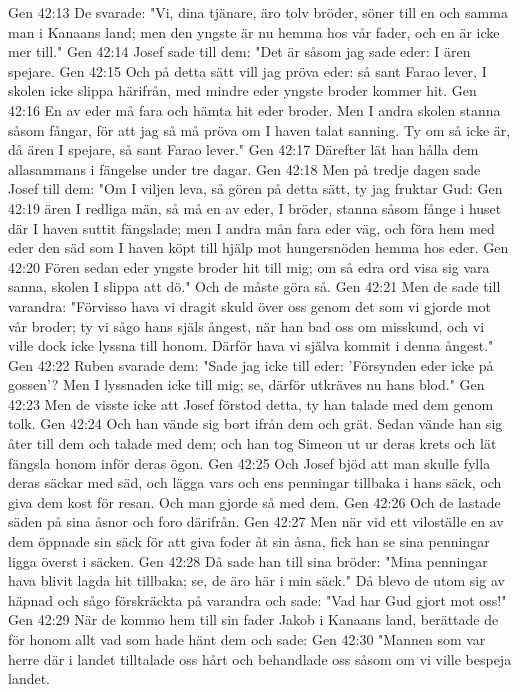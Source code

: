 Gen 42:13  De svarade: "Vi, dina tjänare, äro tolv bröder, söner till en och samma man i Kanaans land; men den yngste är nu hemma hos vår fader, och en är icke mer till."
Gen 42:14  Josef sade till dem: "Det är såsom jag sade eder: I ären spejare.
Gen 42:15  Och på detta sätt vill jag pröva eder: så sant Farao lever, I skolen icke slippa härifrån, med mindre eder yngste broder kommer hit.
Gen 42:16  En av eder må fara och hämta hit eder broder. Men I andra skolen stanna såsom fångar, för att jag så må pröva om I haven talat sanning. Ty om så icke är, då ären I spejare, så sant Farao lever."
Gen 42:17  Därefter lät han hålla dem allasammans i fängelse under tre dagar.
Gen 42:18  Men på tredje dagen sade Josef till dem: "Om I viljen leva, så gören på detta sätt, ty jag fruktar Gud:
Gen 42:19  ären I redliga män, så må en av eder, I bröder, stanna såsom fånge i huset där I haven suttit fängslade; men I andra mån fara eder väg, och föra hem med eder den säd som I haven köpt till hjälp mot hungersnöden hemma hos eder.
Gen 42:20  Fören sedan eder yngste broder hit till mig; om så edra ord visa sig vara sanna, skolen I slippa att dö." Och de måste göra så.
Gen 42:21  Men de sade till varandra: "Förvisso hava vi dragit skuld över oss genom det som vi gjorde mot vår broder; ty vi sågo hans själs ångest, när han bad oss om misskund, och vi ville dock icke lyssna till honom. Därför hava vi själva kommit i denna ångest."
Gen 42:22  Ruben svarade dem: "Sade jag icke till eder: 'Försynden eder icke på gossen'? Men I lyssnaden icke till mig; se, därför utkräves nu hans blod."
Gen 42:23  Men de visste icke att Josef förstod detta, ty han talade med dem genom tolk.
Gen 42:24  Och han vände sig bort ifrån dem och grät. Sedan vände han sig åter till dem och talade med dem; och han tog Simeon ut ur deras krets och lät fängsla honom inför deras ögon.
Gen 42:25  Och Josef bjöd att man skulle fylla deras säckar med säd, och lägga vars och ens penningar tillbaka i hans säck, och giva dem kost för resan. Och man gjorde så med dem.
Gen 42:26  Och de lastade säden på sina åsnor och foro därifrån.
Gen 42:27  Men när vid ett viloställe en av dem öppnade sin säck för att giva foder åt sin åsna, fick han se sina penningar ligga överst i säcken.
Gen 42:28  Då sade han till sina bröder: "Mina penningar hava blivit lagda hit tillbaka; se, de äro här i min säck." Då blevo de utom sig av häpnad och sågo förskräckta på varandra och sade: "Vad har Gud gjort mot oss!"
Gen 42:29  När de kommo hem till sin fader Jakob i Kanaans land, berättade de för honom allt vad som hade hänt dem och sade:
Gen 42:30  "Mannen som var herre där i landet tilltalade oss hårt och behandlade oss såsom om vi ville bespeja landet.
